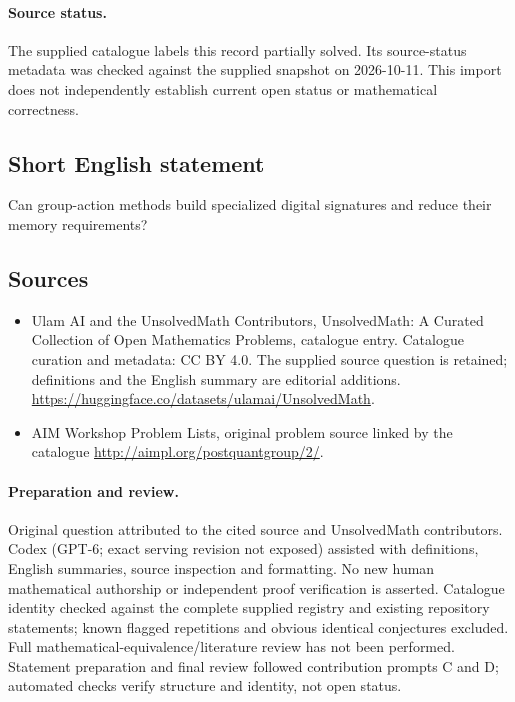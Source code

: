 \documentclass[11pt]{article}
\begin{document}
\paragraph{Source status.}
The supplied catalogue labels this record partially solved. Its source-status metadata was checked against the supplied snapshot on 2026-10-11. This import does not independently establish current open status or mathematical correctness.
\subsection{Short English statement}
Can group-action methods build specialized digital signatures and reduce their memory requirements?
\subsection{Sources}
\begin{itemize}
\item[\hypertarget{source:statement:1}{S1}] Ulam AI and the UnsolvedMath Contributors, UnsolvedMath: A Curated Collection of Open Mathematics Problems, catalogue entry. Catalogue curation and metadata: CC BY 4.0. The supplied source question is retained; definitions and the English summary are editorial additions.
\url{https://huggingface.co/datasets/ulamai/UnsolvedMath}.
\item[\hypertarget{source:statement:2}{S2}] AIM Workshop Problem Lists, original problem source linked by the catalogue
\url{http://aimpl.org/postquantgroup/2/}.
\end{itemize}
\paragraph{Preparation and review.}
Original question attributed to the cited source and UnsolvedMath contributors. Codex (GPT-6; exact serving revision not exposed) assisted with definitions, English summaries, source inspection and formatting. No new human mathematical authorship or independent proof verification is asserted. Catalogue identity checked against the complete supplied registry and existing repository statements; known flagged repetitions and obvious identical conjectures excluded. Full mathematical-equivalence/literature review has not been performed. Statement preparation and final review followed contribution prompts C and D; automated checks verify structure and identity, not open status.
\label{end:statement}
\end{document}

